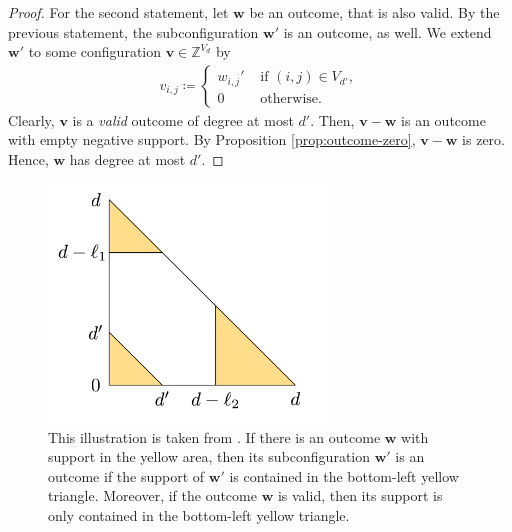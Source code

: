 \begin{proof}
    For the second statement, let \( \mathbf{w} \) be an outcome, that is also valid. By the previous statement, the subconfiguration \( \mathbf{w}' \) is an outcome, as well. We extend \( \mathbf{w}' \) to some configuration \( \mathbf{v} \in \mathbb{Z}^{V_d} \) by 
    \begin{align*}
        v_{i,j} \coloneqq \begin{cases}
            w_{i,j}' & \text{ if } (i,j) \in V_{d'}, \\
            0 & \text{ otherwise}.
        \end{cases}
    \end{align*}
    Clearly, \( \mathbf{v} \) is a \emph{valid} outcome of degree at most \( d' \). Then, \( \mathbf{v} - \mathbf{w} \) is an outcome with empty negative support. By Proposition \ref{prop:outcome-zero}, \(  \mathbf{v} - \mathbf{w} \) is zero. Hence, \( \mathbf{w} \) has degree at most \( d' \).
\end{proof}

\begin{figure}
    \centering
    \includegraphics[width=0.66\textwidth]{assets/hexagon.png}
    \caption{This illustration is taken from \cite{bik2022classifying}. If there is an outcome \( \mathbf{w} \) with support in the yellow area, then its subconfiguration \( \mathbf{w}' \) is an outcome if the support of \( \mathbf{w}' \) is contained in the bottom-left yellow triangle. Moreover, if the outcome \( \mathbf{w} \) is valid, then its support is only contained in the bottom-left yellow triangle.}     \label{fig:hexagon}
\end{figure}